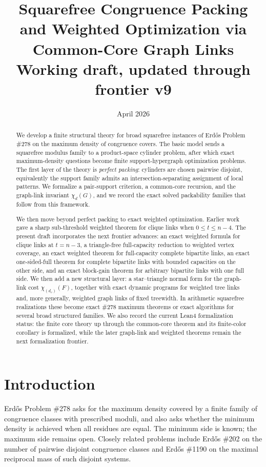 \documentclass[11pt]{article}
\title{Squarefree Congruence Packing and Weighted Optimization via Common-Core Graph Links\\\large Working draft, updated through frontier v9}
\author{}
\date{April 2026}
\theoremstyle{definition}
\newcommand{\Chi}{\chi}
\begin{document}
\maketitle

\begin{abstract}
We develop a finite structural theory for broad squarefree instances of Erd\H{o}s Problem \#278 on the maximum density of congruence covers. The basic model sends a squarefree modulus family to a product-space cylinder problem, after which exact maximum-density questions become finite support-hypergraph optimization problems. The first layer of the theory is \emph{perfect packing}: cylinders are chosen pairwise disjoint, equivalently the support family admits an intersection-separating assignment of local patterns. We formalize a pair-support criterion, a common-core recursion, and the graph-link invariant \(\Chi_d(G)\), and we record the exact solved packability families that follow from this framework.

We then move beyond perfect packing to exact weighted optimization. Earlier work gave a sharp sub-threshold weighted theorem for clique links when \(0\le t\le n-4\). The present draft incorporates the next frontier advances: an exact weighted formula for clique links at \(t=n-3\), a triangle-free full-capacity reduction to weighted vertex coverage, an exact weighted theorem for full-capacity complete bipartite links, an exact one-sided-full theorem for complete bipartite links with bounded capacities on the other side, and an exact block-gain theorem for arbitrary bipartite links with one full side. We then add a new structural layer: a star--triangle normal form for the graph-link cost \(\Chi_{(d_v)}(F)\), together with exact dynamic programs for weighted tree links and, more generally, weighted graph links of fixed treewidth. In arithmetic squarefree realizations these become exact \#278 maximum theorems or exact algorithms for several broad structured families. We also record the current Lean4 formalization status: the finite core theory up through the common-core theorem and its finite-color corollary is formalized, while the later graph-link and weighted theorems remain the next formalization frontier.
\end{abstract}

\section{Introduction}
Erd\H{o}s Problem \#278 asks for the maximum density covered by a finite family of congruence classes with prescribed moduli, and also asks whether the minimum density is achieved when all residues are equal. The minimum side is known; the maximum side remains open. Closely related problems include Erd\H{o}s \#202 on the number of pairwise disjoint congruence classes and Erd\H{o}s \#1190 on the maximal reciprocal mass of such disjoint systems.
\end{document}
